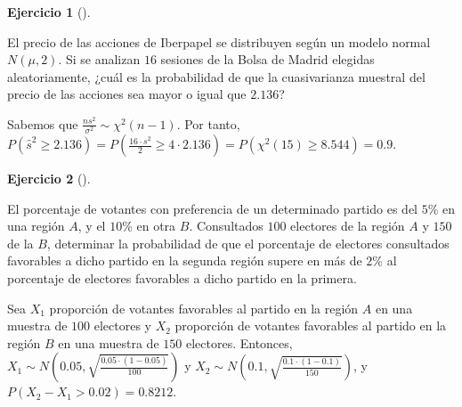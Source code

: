 \documentclass[
  spanish,
  a4paper,
]{scrreport}
\theoremstyle{definition}
\newtheorem{exercise}{Ejercicio}[chapter]
\theoremstyle{remark}
\begin{document}
\begin{exercise}[]\protect\hypertarget{exr-distribución-cuasivarianza-iberpapel}{}\label{exr-distribución-cuasivarianza-iberpapel}

El precio de las acciones de Iberpapel se distribuyen según un modelo
normal \(N(\mu, 2)\). Si se analizan \(16\) sesiones de la Bolsa de
Madrid elegidas aleatoriamente, ¿cuál es la probabilidad de que la
cuasivarianza muestral del precio de las acciones sea mayor o igual que
\(2.136\)?

\end{exercise}

\begin{tcolorbox}[enhanced jigsaw, arc=.35mm, bottomrule=.15mm, bottomtitle=1mm, breakable, colback=white, colbacktitle=quarto-callout-tip-color!10!white, colframe=quarto-callout-tip-color-frame, coltitle=black, left=2mm, leftrule=.75mm, opacityback=0, opacitybacktitle=0.6, rightrule=.15mm, title=\textcolor{quarto-callout-tip-color}{\faLightbulb}\hspace{0.5em}{Solución}, titlerule=0mm, toprule=.15mm, toptitle=1mm]

Sabemos que \(\frac{ns^2}{\sigma^2}\sim \chi^2(n-1)\). Por tanto,
\(P(\hat s^2\geq 2.136) = P\left(\frac{16\cdot s^2}{2}\geq 4\cdot 2.136\right) = P\left(\chi^2(15)\geq 8.544\right) = 0.9\).

\end{tcolorbox}

\begin{exercise}[]\protect\hypertarget{exr-diferencia-proporciones-votos}{}\label{exr-diferencia-proporciones-votos}

El porcentaje de votantes con preferencia de un determinado partido es
del \(5\)\% en una región \(A\), y el \(10\)\% en otra \(B\).
Consultados \(100\) electores de la región \(A\) y \(150\) de la \(B\),
determinar la probabilidad de que el porcentaje de electores consultados
favorables a dicho partido en la segunda región supere en más de \(2\)\%
al porcentaje de electores favorables a dicho partido en la primera.

\end{exercise}

\begin{tcolorbox}[enhanced jigsaw, arc=.35mm, bottomrule=.15mm, bottomtitle=1mm, breakable, colback=white, colbacktitle=quarto-callout-tip-color!10!white, colframe=quarto-callout-tip-color-frame, coltitle=black, left=2mm, leftrule=.75mm, opacityback=0, opacitybacktitle=0.6, rightrule=.15mm, title=\textcolor{quarto-callout-tip-color}{\faLightbulb}\hspace{0.5em}{Solución}, titlerule=0mm, toprule=.15mm, toptitle=1mm]

Sea \(X_1\) proporción de votantes favorables al partido en la región
\(A\) en una muestra de \(100\) electores y \(X_2\) proporción de
votantes favorables al partido en la región \(B\) en una muestra de
\(150\) electores. Entonces,
\(X_1\sim N\left(0.05, \sqrt{\frac{0.05\cdot (1-0.05)}{100}}\right)\) y
\(X_2\sim N\left(0.1, \sqrt{\frac{0.1\cdot (1-0.1)}{150}}\right)\), y
\(P(X_2-X_1>0.02) = 0.8212\).

\end{tcolorbox}
\end{document}
